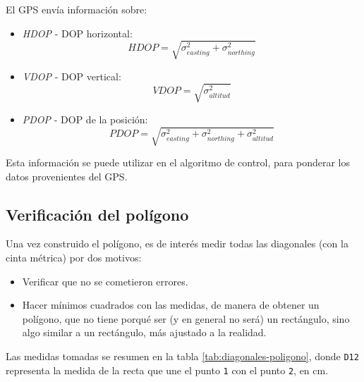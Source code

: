 \documentclass[spanish,12pt,a4paper,titlepage]{report}
\begin{document}
El GPS envía información sobre:
\begin{itemize}
\item \textit{HDOP} - DOP horizontal:
  \begin{equation}
    \label{eq:hdop}
    HDOP = \sqrt{\sigma_{easting}^2+\sigma_{northing}^2}    
  \end{equation}
\item \textit{VDOP} - DOP vertical:
  \begin{equation}
    \label{eq:vdop}
    VDOP = \sqrt{\sigma_{altitud}^2}
  \end{equation}
\item \textit{PDOP} - DOP de la posición:
  \begin{equation}
    \label{eq:pdop}
    PDOP = \sqrt{\sigma_{easting}^2+\sigma_{northing}^2 + \sigma_{altitud}^2}
  \end{equation}
\end{itemize}

Esta información se puede utilizar en el algoritmo de control, para ponderar los datos provenientes del GPS.

\newpage
\subsection{Verificación del polígono}
\label{sec:verificacion-del-poligono}

Una vez construido el polígono, es de interés medir todas las diagonales (con la cinta métrica) por dos motivos:
\begin{itemize}
\item Verificar que no se cometieron errores.
\item Hacer mínimos cuadrados con las medidas, de manera de obtener un polígono, que no tiene porqué ser (y en general no será) un rectángulo, sino algo similar a un rectángulo, más ajustado a la realidad.
\end{itemize}

Las medidas tomadas se resumen en la tabla \ref{tab:diagonales-poligono}, donde \verb+D12+ representa la medida de la recta que une el punto \verb+1+ con el punto \verb+2+, en cm.
\end{document}
